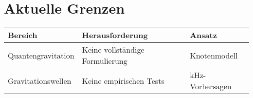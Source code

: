 \section{Aktuelle Grenzen}
\begin{table}[H]
    \centering
    \begin{tabular}{lp{4cm}p{4cm}}
        \toprule
        Bereich & Herausforderung & Ansatz \\
        \midrule
        Quantengravitation & Keine vollständige Formulierung & Knotenmodell \\
        Gravitationswellen & Keine empirischen Tests & kHz-Vorhersagen \\
        \bottomrule
    \end{tabular}
\end{table}